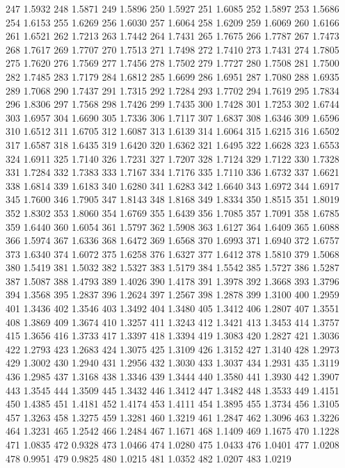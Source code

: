 247 1.5932
248 1.5871
249 1.5896
250 1.5927
251 1.6085
252 1.5897
253 1.5686
254 1.6153
255 1.6269
256 1.6030
257 1.6064
258 1.6209
259 1.6069
260 1.6166
261 1.6521
262 1.7213
263 1.7442
264 1.7431
265 1.7675
266 1.7787
267 1.7473
268 1.7617
269 1.7707
270 1.7513
271 1.7498
272 1.7410
273 1.7431
274 1.7805
275 1.7620
276 1.7569
277 1.7456
278 1.7502
279 1.7727
280 1.7508
281 1.7500
282 1.7485
283 1.7179
284 1.6812
285 1.6699
286 1.6951
287 1.7080
288 1.6935
289 1.7068
290 1.7437
291 1.7315
292 1.7284
293 1.7702
294 1.7619
295 1.7834
296 1.8306
297 1.7568
298 1.7426
299 1.7435
300 1.7428
301 1.7253
302 1.6744
303 1.6957
304 1.6690
305 1.7336
306 1.7117
307 1.6837
308 1.6346
309 1.6596
310 1.6512
311 1.6705
312 1.6087
313 1.6139
314 1.6064
315 1.6215
316 1.6502
317 1.6587
318 1.6435
319 1.6420
320 1.6362
321 1.6495
322 1.6628
323 1.6553
324 1.6911
325 1.7140
326 1.7231
327 1.7207
328 1.7124
329 1.7122
330 1.7328
331 1.7284
332 1.7383
333 1.7167
334 1.7176
335 1.7110
336 1.6732
337 1.6621
338 1.6814
339 1.6183
340 1.6280
341 1.6283
342 1.6640
343 1.6972
344 1.6917
345 1.7600
346 1.7905
347 1.8143
348 1.8168
349 1.8334
350 1.8515
351 1.8019
352 1.8302
353 1.8060
354 1.6769
355 1.6439
356 1.7085
357 1.7091
358 1.6785
359 1.6440
360 1.6054
361 1.5797
362 1.5908
363 1.6127
364 1.6409
365 1.6088
366 1.5974
367 1.6336
368 1.6472
369 1.6568
370 1.6993
371 1.6940
372 1.6757
373 1.6340
374 1.6072
375 1.6258
376 1.6327
377 1.6412
378 1.5810
379 1.5068
380 1.5419
381 1.5032
382 1.5327
383 1.5179
384 1.5542
385 1.5727
386 1.5287
387 1.5087
388 1.4793
389 1.4026
390 1.4178
391 1.3978
392 1.3668
393 1.3796
394 1.3568
395 1.2837
396 1.2624
397 1.2567
398 1.2878
399 1.3100
400 1.2959
401 1.3436
402 1.3546
403 1.3492
404 1.3480
405 1.3412
406 1.2807
407 1.3551
408 1.3869
409 1.3674
410 1.3257
411 1.3243
412 1.3421
413 1.3453
414 1.3757
415 1.3656
416 1.3733
417 1.3397
418 1.3394
419 1.3083
420 1.2827
421 1.3036
422 1.2793
423 1.2683
424 1.3075
425 1.3109
426 1.3152
427 1.3140
428 1.2973
429 1.3002
430 1.2940
431 1.2956
432 1.3030
433 1.3037
434 1.2931
435 1.3119
436 1.2985
437 1.3168
438 1.3346
439 1.3444
440 1.3580
441 1.3930
442 1.3907
443 1.3545
444 1.3509
445 1.3432
446 1.3412
447 1.3482
448 1.3533
449 1.4151
450 1.4385
451 1.4181
452 1.4174
453 1.4111
454 1.3895
455 1.3734
456 1.3105
457 1.3263
458 1.3275
459 1.3281
460 1.3219
461 1.2847
462 1.3096
463 1.3226
464 1.3231
465 1.2542
466 1.2484
467 1.1671
468 1.1409
469 1.1675
470 1.1228
471 1.0835
472 0.9328
473 1.0466
474 1.0280
475 1.0433
476 1.0401
477 1.0208
478 0.9951
479 0.9825
480 1.0215
481 1.0352
482 1.0207
483 1.0219
